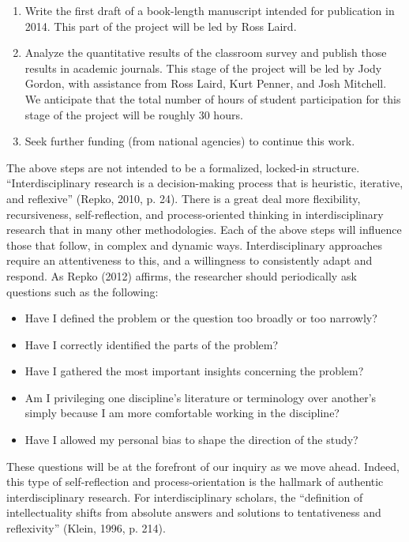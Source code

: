 \documentclass[letterpaper,10pt,headsepline]{scrreprt}
\begin{document}
\begin{enumerate}
\item Write the first draft of a book-length manuscript intended for
  publication in 2014. This part of the project will be led by Ross Laird.

\item Analyze the quantitative results of the classroom survey and publish
  those results in academic journals. This stage of the project will be led by
  Jody Gordon, with assistance from Ross Laird, Kurt Penner, and Josh
  Mitchell. We anticipate that the total number of hours of student
  participation for this stage of the project will be roughly 30 hours.

\item Seek further funding (from national agencies) to continue this work.

  \end{enumerate}

  The above steps are not intended to be a formalized, locked-in structure.
  ``Interdisciplinary research is a decision-making process that is heuristic,
  iterative, and reﬂexive'' (Repko, 2010, p. 24). There is a great deal more
  flexibility, recursiveness, self-reflection, and process-oriented thinking
  in interdisciplinary research that in many other methodologies. Each of the
  above steps will influence those that follow, in complex and dynamic ways.
  Interdisciplinary approaches require an attentiveness to this, and a
  willingness to consistently adapt and respond. As Repko (2012) affirms, the
  researcher should periodically ask questions such as the following:

  \begin{itemize}
    \item Have I deﬁned the problem or the question too broadly or too
      narrowly?
    \item Have I correctly identiﬁed the parts of the problem?
    \item Have I gathered the most important insights concerning the problem?
    \item Am I privileging one discipline's literature or terminology over another's simply
      because I am more comfortable working in the discipline?
    \item Have I allowed my personal bias to shape the direction of the study?
      \end{itemize}

      These questions will be at the forefront of our inquiry as we move
      ahead. Indeed, this type of self-reflection and process-orientation is
      the hallmark of authentic interdisciplinary research. For
      interdisciplinary scholars, the ``definition of intellectuality shifts
      from absolute answers and solutions to tentativeness and reflexivity''
      (Klein, 1996, p. 214).
\end{document}
